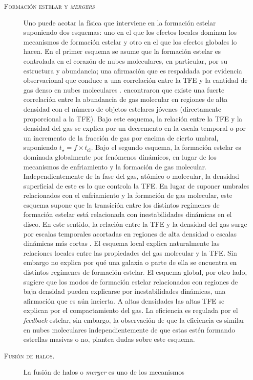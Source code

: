 \documentclass[xcolor=dvipsnames,4pt,hyperref={colorlinks,citecolor=black,linkcolor=black,urlcolor=black}]{beamer}
\begin{document}
\begin{frame}[allowframebreaks]{\textsc{Formación estelar y \emph{mergers}}}
\begin{description}
Uno puede acotar la física que interviene en la formación estelar suponiendo dos esquemas: uno en el
que los efectos locales dominan los mecanismos de formación estelar y otro en el que los efectos
globales lo hacen. En el primer esquema se asume que la formación estelar es controlada en el
corazón de nubes moleculares, en particular, por su estructura y abundancia; una afirmación que es
respaldada por evidencia observacional que conduce a una correlación entre la TFE y la cantidad de
gas denso en nubes moleculares \citep[e.\,g.][]{Lada2010}. \citet{Lada2010} encontraron que existe
una fuerte correlación entre la abundancia de gas molecular en regiones de alta densidad con el
número de objetos estelares jóvenes (directamente proporcional a la TFE). Bajo este esquema, la
relación entre la TFE y la densidad del gas se explica por un decremento en la escala temporal o por
un incremento de la fracción de gas por encima de cierto umbral, suponiendo $t_\star=f\times
t_\text{cl}$.
Bajo el segundo esquema, la formación estelar es dominada globalmente por fenómenos dinámicos, en
lugar de los mecanismos de enfriamiento y la formación de gas molecular. Independientemente de la
fase del gas, atómico o molecular, la densidad superficial de este es lo que controla la TFE. En
lugar de suponer umbrales relacionados con el enfriamiento y la formación de gas molecular, este
esquema supone que la transición entre los distintos regímenes de formación estelar está relacionada
con inestabilidades dinámicas en el disco. En este sentido, la relación entre la TFE y la densidad
del gas surge por escalas temporales acortadas en regiones de alta densidad o escalas dinámicas más
cortas \citep[e.\,g.][]{Ostriker2010}.
%
El esquema local explica naturalmente las relaciones locales entre las propiedades del gas molecular
y la TFE. Sin embargo no explica por qué una galaxia o parte de ella se encuentra en distintos
regímenes de formación estelar. El esquema global, por otro lado, sugiere que los modos de formación
estelar relacionados con regiones de baja densidad pueden explicarse por inestabilidades dinámicas,
una afirmación que es aún incierta. A altas densidades las altas TFE se explican por el
compactamiento del gas. La eficiencia es regulada por el \emph{feedback} estelar, sin embargo, la
observación de que la eficiencia es similar en nubes moleculares independientemente de que estas
estén formando estrellas masivas o no, plantea dudas sobre este esquema.
%
\item[\textsc{Fusión de halos.}] La fusión de halos o \emph{merger} es uno de los mecanismos

\end{description}
\end{frame}
\end{document}
